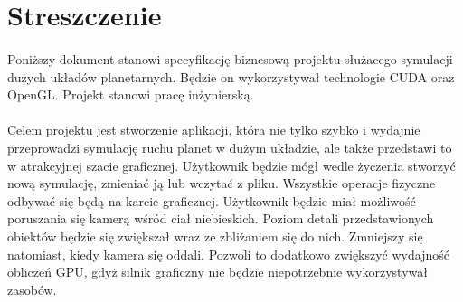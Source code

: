 \section{Streszczenie}\label{sec:wstep}
	
\paragraph{}

Poniższy dokument stanowi specyfikację biznesową projektu służacego symulacji dużych układów planetarnych. Będzie on wykorzystywał technologie CUDA oraz OpenGL. Projekt stanowi pracę inżynierską.

\paragraph{}

Celem projektu jest stworzenie aplikacji, która nie tylko szybko i wydajnie przeprowadzi symulację ruchu planet w dużym układzie, ale także przedstawi to w atrakcyjnej szacie graficznej. Użytkownik będzie mógł wedle życzenia stworzyć nową symulację, zmieniać ją lub wczytać z pliku.
Wszystkie operacje fizyczne odbywać się będą na karcie graficznej. Użytkownik będzie miał możliwość poruszania się kamerą wśród ciał niebieskich. Poziom detali przedstawionych obiektów będzie się zwiększał wraz ze zbliżaniem się do nich. Zmniejszy się natomiast, kiedy kamera się oddali. Pozwoli to dodatkowo zwiększyć wydajność obliczeń GPU, gdyż silnik graficzny nie będzie niepotrzebnie wykorzystywał zasobów.
